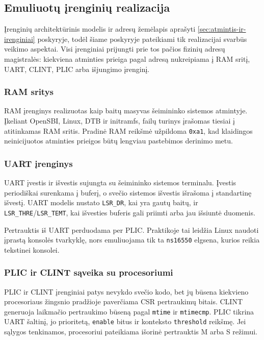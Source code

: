 \subsection{Emuliuotų įrenginių realizacija}
\label{sec:irenginiu-realizacija}

Įrenginių architektūrinis modelis ir adresų žemėlapis aprašyti \ref{sec:atmintis-ir-irenginiai} poskyryje, todėl šiame poskyryje pateikiami tik realizacijai svarbūs veikimo aspektai. Visi įrenginiai prijungti prie tos pačios fizinių adresų magistralės: kiekviena atminties prieiga pagal adresą nukreipiama į RAM sritį, UART, CLINT, PLIC arba išjungimo įrenginį.

\subsubsection{RAM sritys}

RAM įrenginys realizuotas kaip baitų masyvas šeimininko sistemos atmintyje. Įkeliant OpenSBI, Linux, DTB ir initramfs, failų turinys įrašomas tiesiai į atitinkamas RAM sritis. Pradinė RAM reikšmė užpildoma \texttt{0xa1}, kad klaidingos neinicijuotos atminties prieigos būtų lengviau pastebimos derinimo metu.

\subsubsection{UART įrenginys}

UART įvestis ir išvestis sujungta su šeimininko sistemos terminalu. Įvestis periodiškai surenkama į buferį, o svečio sistemos išvestis išrašoma į standartinę išvestį. UART modelis nustato \texttt{LSR\_DR}, kai yra gautų baitų, ir \texttt{LSR\_THRE}/\texttt{LSR\_TEMT}, kai išvesties buferis gali priimti arba jau išsiuntė duomenis.

Pertrauktis iš UART perduodama per PLIC. Praktikoje tai leidžia Linux naudoti įprastą konsolės tvarkyklę, nors emuliuojama tik ta \texttt{ns16550} elgsena, kurios reikia tekstinei konsolei.

\subsubsection{PLIC ir CLINT sąveika su procesoriumi}

PLIC ir CLINT įrenginiai patys nevykdo svečio kodo, bet jų būsena kiekvieno procesoriaus žingsnio pradžioje paverčiama CSR pertraukimų bitais. CLINT generuoja laikmačio pertraukimo būseną pagal \texttt{mtime} ir \texttt{mtimecmp}. PLIC tikrina UART šaltinį, jo prioritetą, \texttt{enable} bitus ir konteksto \texttt{threshold} reikšmę. Jei sąlygos tenkinamos, procesoriui pateikiama išorinė pertrauktis M arba S režimui.

